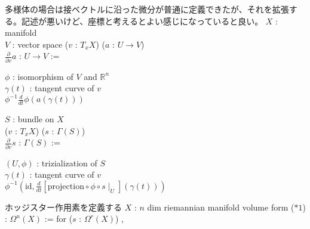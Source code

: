 \begin{Definition}
\itemnote
  多様体の場合は接ベクトルに沿った微分が普通に定義できたが、それを拡張する。記述が悪いけど、座標と考えるとよい感じになっていると良い。
\itemwhen
  \Fix \(X\) : manifold \\
\itemdefi
  \Fix \(V\) : vector space
  \For (\(v\) : \(T_x X\)) (\(a\) : \(U \to V\)) \\
  \Define \(\frac{\partial}{\partial v} a\) : \(U \to V\) :=
  \begin{indentblock}
    \Take \(\phi\) : isomorphism of \(V\) and \(\mathbb{R}^n\) \\
    \Take \(\gamma(t)\) : tangent curve of \(v\) \\
    \Return \(\phi^{-1} \frac{d}{dt} \phi (a (\gamma (t)))\)
  \end{indentblock}
\itemdefi
  \Fix \(S\) : bundle on \(X\) \\
  \For (\(v\) : \(T_x X\)) (\(s\) : \(\Gamma(S)\)) \\
  \Define \(\frac{\partial}{\partial v} s\) : \(\Gamma(S)\) :=
  \begin{indentblock}
    \Take \((U , \phi)\) : trizialization of \(S\) \\
    \Take \(\gamma(t)\) : tangent curve of \(v\) \\
    \Return \(\phi^{-1} (\text{id} , \frac{d}{dt} [\text{projection} \circ \phi \circ s \mid_{U}](\gamma(t)))\)
  \end{indentblock}
\end{Definition}

\begin{Definition}
\itemnote
  ホッジスター作用素を定義する
\itemwhen
  \Fix \(X\) : \(n\) dim riemannian manifold
\itemdefi
  \Define volume form (\(*1\)) : \(\Omega^n(X)\) := 
  \Define for (\(s\) : \(\Omega^r(X)\)) , 
\end{Definition}